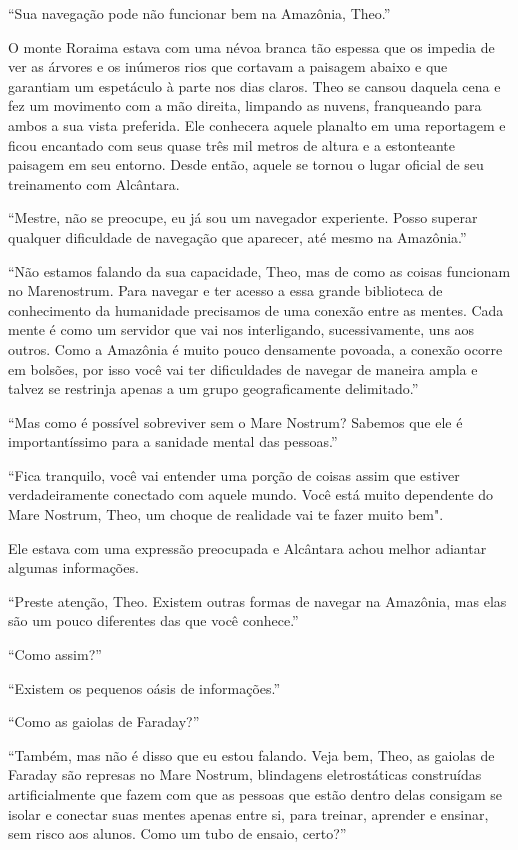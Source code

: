 ``Sua navegação pode não funcionar bem na Amazônia, Theo.''

O monte Roraima estava com uma névoa branca tão espessa que os impedia
de ver as árvores e os inúmeros rios que cortavam a paisagem abaixo e
que garantiam um espetáculo à parte nos dias claros. Theo se cansou
daquela cena e fez um movimento com a mão direita, limpando as nuvens,
franqueando para ambos a sua vista preferida. Ele conhecera aquele
planalto em uma reportagem e ficou encantado com seus quase três mil
metros de altura e a estonteante paisagem em seu entorno. Desde então,
aquele se tornou o lugar oficial de seu treinamento com Alcântara.

``Mestre, não se preocupe, eu já sou um navegador experiente. Posso
superar qualquer dificuldade de navegação que aparecer, até mesmo na
Amazônia.''

``Não estamos falando da sua capacidade, Theo, mas de como as coisas
funcionam no Marenostrum. Para navegar e ter acesso a essa grande
biblioteca de conhecimento da humanidade precisamos de uma conexão entre
as mentes. Cada mente é como um servidor que vai nos interligando,
sucessivamente, uns aos outros. Como a Amazônia é muito pouco densamente
povoada, a conexão ocorre em bolsões, por isso você vai ter dificuldades
de navegar de maneira ampla e talvez se restrinja apenas a um grupo
geograficamente delimitado.''

``Mas como é possível sobreviver sem o Mare Nostrum? Sabemos que ele é
importantíssimo para a sanidade mental das pessoas.''

``Fica tranquilo, você vai entender uma porção de coisas assim que
estiver verdadeiramente conectado com aquele mundo. Você está muito
dependente do Mare Nostrum, Theo, um choque de realidade vai te fazer
muito bem".

Ele estava com uma expressão preocupada e Alcântara achou melhor
adiantar algumas informações.

``Preste atenção, Theo. Existem outras formas de navegar na Amazônia,
mas elas são um pouco diferentes das que você conhece.''

``Como assim?''

``Existem os pequenos oásis de informações.''

``Como as gaiolas de Faraday?''

``Também, mas não é disso que eu estou falando. Veja bem, Theo, as
gaiolas de Faraday são represas no Mare Nostrum, blindagens
eletrostáticas construídas artificialmente que fazem com que as pessoas
que estão dentro delas consigam se isolar e conectar suas mentes apenas
entre si, para treinar, aprender e ensinar, sem risco aos alunos. Como
um tubo de ensaio, certo?''

